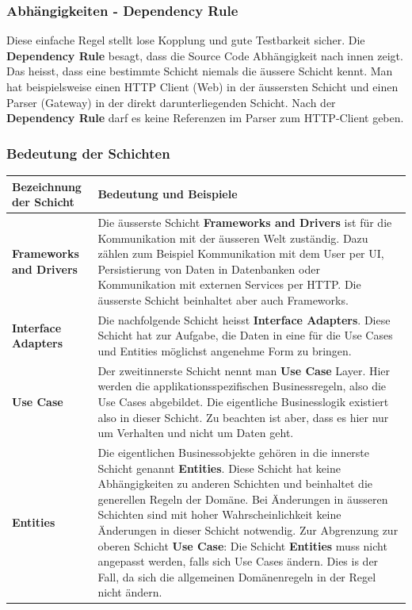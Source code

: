 \documentclass[a4paper,10pt,xetex]{article}
\begin{document}
\subsubsection{Abhängigkeiten - Dependency Rule}\label{dependencyrule}
Diese einfache Regel stellt lose Kopplung und gute Testbarkeit sicher. 
Die \textbf{Dependency Rule} besagt, dass die Source Code Abhängigkeit nach innen zeigt. 
Das heisst, dass eine bestimmte Schicht niemals die äussere Schicht kennt. 
Man hat beispielsweise einen HTTP Client (Web) in der äussersten Schicht und 
einen Parser (Gateway) in der direkt darunterliegenden Schicht. Nach der 
\textbf{Dependency Rule} darf es keine Referenzen im Parser zum HTTP-Client geben.

\subsubsection{Bedeutung der Schichten}\label{layers}
\begin{longtabu} to \textwidth { | l | X[l] |  }
\hline
\textbf{Bezeichnung der Schicht} & \textbf{Bedeutung und Beispiele}\\\hline
\endhead
\textbf{Frameworks and Drivers} & Die äusserste Schicht \textbf{Frameworks and Drivers} 
ist für die Kommunikation mit der äusseren Welt zuständig. Dazu zählen zum 
Beispiel Kommunikation mit dem User per UI, Persistierung von Daten in Datenbanken 
oder Kommunikation mit externen Services per HTTP. Die äusserste Schicht beinhaltet 
aber auch Frameworks.\\\hline
\textbf{Interface Adapters} & Die nachfolgende Schicht heisst \textbf{Interface Adapters}. 
Diese Schicht hat zur Aufgabe, die Daten in eine für die Use Cases und Entities 
möglichst angenehme Form zu bringen.\\\hline
\textbf{Use Case} & Der zweitinnerste Schicht nennt man \textbf{Use Case} Layer. 
Hier werden die applikationsspezifischen Businessregeln, also die Use Cases abgebildet. 
Die eigentliche Businesslogik existiert also in dieser Schicht. Zu beachten ist aber, 
dass es hier nur um Verhalten und nicht um Daten geht.\\\hline
\textbf{Entities} & Die eigentlichen Businessobjekte gehören in die innerste 
Schicht genannt \textbf{Entities}. Diese Schicht hat keine Abhängigkeiten zu 
anderen Schichten und beinhaltet die generellen Regeln der Domäne. Bei Änderungen 
in äusseren Schichten sind mit hoher Wahrscheinlichkeit keine Änderungen in dieser 
Schicht notwendig. Zur Abgrenzung zur oberen Schicht \textbf{Use Case}: Die Schicht \textbf{Entities} 
muss nicht angepasst werden, falls sich Use Cases ändern. Dies is der Fall, da 
sich die allgemeinen Domänenregeln in der Regel nicht ändern.\\\hline
\end{longtabu}
\end{document}
